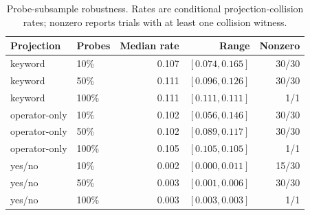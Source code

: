 \begin{table}[t]
\centering
\caption{Probe-subsample robustness. Rates are conditional projection-collision rates; nonzero reports trials with at least one collision witness.}
\label{tab:probe-subsample}
\small
\begin{tabular}{llrrr}
\toprule
Projection & Probes & Median rate & Range & Nonzero \\
\midrule
keyword & 10\% & 0.107 & {\([0.074,0.165]\)} & 30/30 \\
keyword & 50\% & 0.111 & {\([0.096,0.126]\)} & 30/30 \\
keyword & 100\% & 0.111 & {\([0.111,0.111]\)} & 1/1 \\
operator-only & 10\% & 0.102 & {\([0.056,0.146]\)} & 30/30 \\
operator-only & 50\% & 0.102 & {\([0.089,0.117]\)} & 30/30 \\
operator-only & 100\% & 0.105 & {\([0.105,0.105]\)} & 1/1 \\
yes/no & 10\% & 0.002 & {\([0.000,0.011]\)} & 15/30 \\
yes/no & 50\% & 0.003 & {\([0.001,0.006]\)} & 30/30 \\
yes/no & 100\% & 0.003 & {\([0.003,0.003]\)} & 1/1 \\
\bottomrule
\end{tabular}
\end{table}
